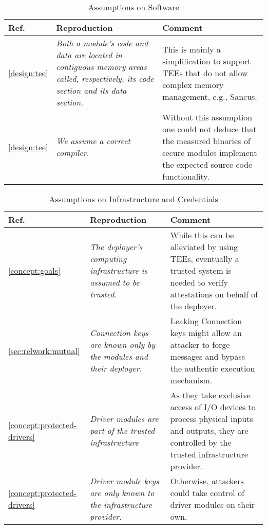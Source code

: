 \begin{longtable}{|p{}|p{}|p{}|}
\caption{Assumptions on Software}\\
\hline
Ref. & Reproduction & Comment \\
\hline
\hline

\ref{design:tee} &
\em Both a module’s code and data are located in contiguous memory areas called, respectively, its code section and its data section. &
This is mainly a simplification to support TEEs that do not allow complex memory management, e.g., Sancus. \\
\hline

\ref{design:tee} &
\em We assume a correct compiler. &
Without this assumption one could not deduce that the measured binaries of secure modules implement the expected source code functionality. \\
\hline

\end{longtable}

\begin{longtable}{|p{}|p{}|p{}|}
\caption{Assumptions on Infrastructure and Credentials}\\
\hline
Ref. & Reproduction & Comment \\
\hline
\hline

\ref{concept:goals} &
\em The deployer’s computing infrastructure is assumed to be trusted. &
While this can be alleviated by using TEEs, eventually a trusted system is needed to verify attestations on behalf of the deployer. \\
\hline

\ref{sec:relwork:mutual} &
\em Connection keys are known only by the modules and their deployer. &
Leaking Connection keys might allow an attacker to forge messages and bypass the authentic execution mechanism. \\
\hline

\ref{concept:protected-drivers} &
\em Driver modules are part of the trusted infrastructure &
As they take exclusive access of I/O devices to process physical inputs and outputs, they are controlled by the trusted infrastructure provider. \\ 
\hline

\ref{concept:protected-drivers} &
\em Driver module keys are only known to the infrastructure provider. &
Otherwise, attackers could take control of driver modules on their own. \\
\hline

\end{longtable}

